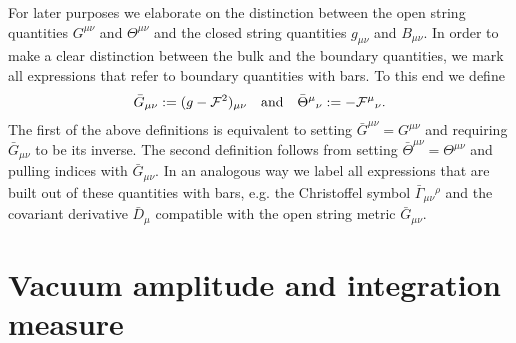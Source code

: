 \documentclass[a4paper,12pt]{article}
\newcommand {\cF} {{\cal F}}
\begin{document}
For later purposes we elaborate on the distinction between the open 
string quantities $G^{\mu\nu}$ and $\Theta^{\mu\nu}$ and the closed 
string quantities $g_{\mu\nu}$ and $B_{\mu\nu}$. 
In order to make a clear distinction between the bulk and the boundary 
quantities, we mark all expressions that refer to boundary quantities 
with bars. To this end we define
\begin{eqnarray}
  \label{eq:boundquant}
  \bar G_{\mu\nu} := (g-\cF^2)_{\mu\nu} \quad \mathrm{and} \quad
  \bar \Theta^\mu{}_\nu := -\cF^\mu{}_\nu.
\end{eqnarray}
The first of the above  definitions is equivalent to setting 
$\bar G^{\mu\nu} = G^{\mu\nu}$ and requiring $\bar G_{\mu\nu}$ to be its 
inverse. The second definition follows from setting 
$\bar\Theta^{\mu\nu}=\Theta^{\mu\nu}$ and pulling indices with 
$\bar G_{\mu\nu}$. In an analogous way we label all expressions that are
built out of these quantities with bars, e.g. the Christoffel symbol 
$\bar \Gamma_{\mu\nu}{}^\rho$ and the covariant derivative 
$\bar D_\mu$ compatible with the open string metric $\bar G_{\mu\nu}$. 

\section{Vacuum amplitude and integration measure}
\label{sec:vacloops}
\end{document}
